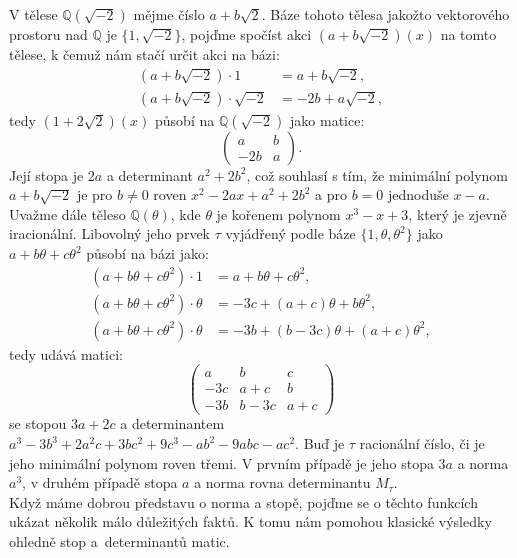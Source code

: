 \documentclass [12pt]{report}
\begin{document}
V tělese $\mathbb{Q}(\sqrt{-2})$ mějme číslo $a+b\sqrt{2}$. Báze tohoto tělesa jakožto vektorového prostoru nad $\mathbb{Q}$ je $\lbrace 1,\sqrt{-2}\rbrace$, pojďme spočíst akci $(a+b\sqrt{-2})(x)$ na tomto tělese, k čemuž nám stačí určit akci na bázi:
\begin{align*}
(a+b\sqrt{-2}) \cdot 1 &= a + b \sqrt{-2},\\
(a+b\sqrt{-2}) \cdot \sqrt{-2} &= -2b + a\sqrt{-2},
\end{align*}
tedy $(1+2\sqrt{2})(x)$ působí na $\mathbb{Q}(\sqrt{-2})$ jako matice:
\begin{equation*}
\begin{pmatrix}
a & b\\
-2b & a 
\end{pmatrix}.
\end{equation*}    
Její stopa je $2a$ a determinant $a^2+2b^2$, což souhlasí s tím, že minimální polynom $a+b\sqrt{-2}$ je pro $b \neq 0$ roven $x^2 - 2ax + a^2+2b^2$ a pro $b=0$ jednoduše $x-a$.\\

Uvažme dále těleso $\mathbb{Q}(\theta)$, kde $\theta$ je kořenem polynom $x^3 - x + 3$, který je zjevně iracionální. Libovolný jeho prvek $\tau$ vyjádřený podle báze $\lbrace 1,\theta,\theta^2 \rbrace$ jako $a + b\theta + c \theta^2$ působí na bázi jako:
\begin{align*}
(a + b\theta + c \theta^2) \cdot 1 &= a + b\theta + c \theta^2,\\
(a + b\theta + c \theta^2) \cdot \theta &=  -3c + (a+c)\theta + b \theta^2,\\
(a + b\theta + c \theta^2) \cdot \theta &=  -3b + (b-3c)\theta + (a+c) \theta^2,
\end{align*}
tedy udává matici:
\begin{equation*}
\begin{pmatrix}
a & b & c\\
-3c & a+c & b\\
-3b & b-3c & a+c 
\end{pmatrix}
\end{equation*} 
se stopou $3a+2c$ a determinantem $ a^3 - 3 b^3 + 2 a^2 c + 3 b c^2 + 9 c^3 - ab^2 - 9 ab c - ac^2$. Buď je $\tau$ racionální číslo, či je jeho minimální polynom roven třemi. V prvním případě je jeho stopa $3a$ a norma $a^3$, v druhém případě stopa $a$ a norma rovna determinantu $M_\tau$.\\

Když máme dobrou představu o norma a stopě, pojďme se o těchto funkcích ukázat několik málo důležitých faktů. K tomu nám pomohou klasické výsledky ohledně stop a~determinantů matic.
\end{document}
